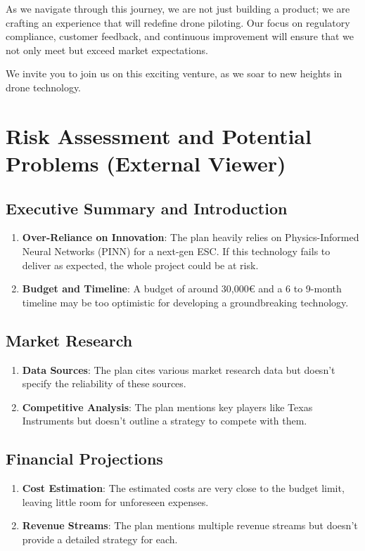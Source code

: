 \documentclass[12pt]{article}
\begin{document}
	As we navigate through this journey, we are not just building a product; we are crafting an experience that will redefine drone piloting. Our focus on regulatory compliance, customer feedback, and continuous improvement will ensure that we not only meet but exceed market expectations.
	
	We invite you to join us on this exciting venture, as we soar to new heights in drone technology.
	
	\section{Risk Assessment and Potential Problems (External Viewer)}
	
	\subsection{Executive Summary and Introduction}
	\begin{enumerate}
		\item \textbf{Over-Reliance on Innovation}: The plan heavily relies on Physics-Informed Neural Networks (PINN) for a next-gen ESC. If this technology fails to deliver as expected, the whole project could be at risk.
		\item \textbf{Budget and Timeline}: A budget of around 30,000€ and a 6 to 9-month timeline may be too optimistic for developing a groundbreaking technology.
	\end{enumerate}
	
	\subsection{Market Research}
	\begin{enumerate}
		\item \textbf{Data Sources}: The plan cites various market research data but doesn't specify the reliability of these sources.
		\item \textbf{Competitive Analysis}: The plan mentions key players like Texas Instruments but doesn't outline a strategy to compete with them.
	\end{enumerate}
	
	\subsection{Financial Projections}
	\begin{enumerate}
		\item \textbf{Cost Estimation}: The estimated costs are very close to the budget limit, leaving little room for unforeseen expenses.
		\item \textbf{Revenue Streams}: The plan mentions multiple revenue streams but doesn't provide a detailed strategy for each.
	\end{enumerate}
	
\end{document}
